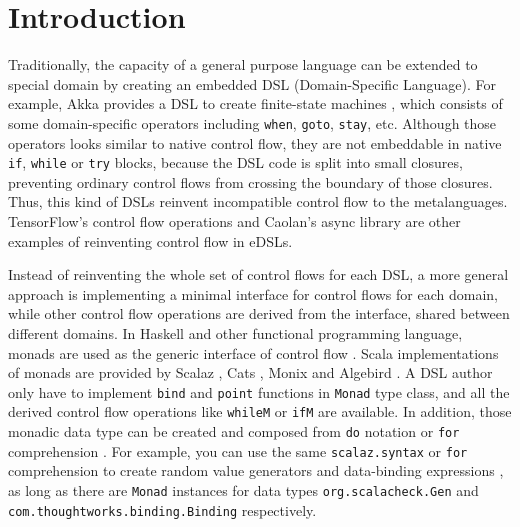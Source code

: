 \section{Introduction}\label{Introduction}

Traditionally, the capacity of a general purpose language can be extended to special domain by creating an embedded DSL (Domain-Specific Language). For example, Akka provides a DSL to create finite-state machines \cite{lightbend2017akka}, which consists of some domain-specific operators including \lstinline{when}, \lstinline{goto}, \lstinline{stay}, etc. Although those operators looks similar to native control flow, they are not embeddable in native \lstinline{if}, \lstinline{while} or \lstinline{try} blocks, because the DSL code is split into small closures, preventing ordinary control flows from crossing the boundary of those closures. Thus, this kind of DSLs reinvent incompatible control flow to the metalanguages. TensorFlow's control flow operations \cite{abadi2016tensorflow} and Caolan's async library \cite{caolan2017async} are other examples of reinventing control flow in eDSLs.

Instead of reinventing the whole set of control flows for each DSL, a more general approach is implementing a minimal interface for control flows for each domain, while other control flow operations are derived from the interface, shared between different domains. In Haskell and other functional programming language, monads are used as the generic interface of control flow \cite{wadler1990comprehending,wadler1992essence,jones1993composing}. Scala implementations of monads are provided by Scalaz \cite{kenji2017scalaz}, Cats \cite{typelevel2017cats}, Monix \cite{nedelcu2017monix} and Algebird \cite{twitter2016algebird}. A DSL author only have to implement \lstinline{bind} and \lstinline{point} functions in \lstinline{Monad} type class, and all the derived control flow operations like \lstinline{whileM} or \lstinline{ifM} are available. In addition, those monadic data type can be created and composed from \lstinline{do} notation \cite{jones1998haskell} or \lstinline{for} comprehension \cite{odersky2004scala}. For example, you can use the same \lstinline{scalaz.syntax} or \lstinline{for} comprehension to create random value generators \cite{nilsson2015scalacheck} and data-binding expressions \cite{yangbo2016binding}, as long as there are \lstinline{Monad} instances for data types \lstinline{org.scalacheck.Gen} and \lstinline{com.thoughtworks.binding.Binding} respectively.

